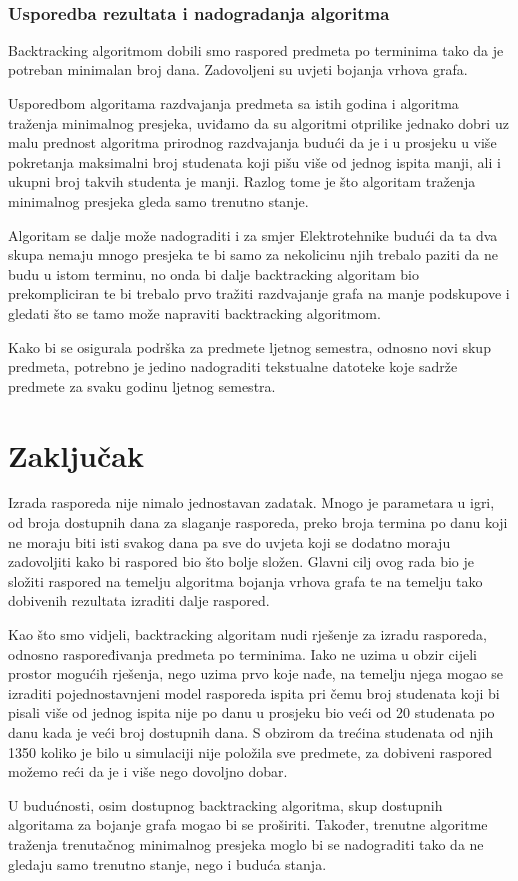 \documentclass[times, utf8, zavrsni, numeric]{fer}
\begin{document}
\newpage~\newpage
\subsection{Usporedba rezultata i nadogradanja algoritma}
Backtracking algoritmom dobili smo raspored predmeta po terminima tako da je potreban minimalan broj dana. Zadovoljeni su uvjeti bojanja vrhova grafa.\par
Usporedbom algoritama razdvajanja predmeta sa istih godina i algoritma traženja minimalnog presjeka, uviđamo da su algoritmi otprilike jednako dobri uz malu prednost algoritma prirodnog razdvajanja budući da je i u prosjeku u više pokretanja maksimalni broj studenata koji pišu više od jednog ispita manji, ali i ukupni broj takvih studenta je manji. Razlog tome je što algoritam traženja minimalnog presjeka gleda samo trenutno stanje.\par
Algoritam se dalje može nadograditi i za smjer Elektrotehnike budući da ta dva skupa nemaju mnogo presjeka te bi samo za nekolicinu njih trebalo paziti da ne budu u istom terminu, no onda bi dalje backtracking algoritam bio prekompliciran te bi trebalo prvo tražiti razdvajanje grafa na manje podskupove i gledati što se tamo može napraviti backtracking algoritmom.\par
Kako bi se osigurala podrška za predmete ljetnog semestra, odnosno novi skup predmeta, potrebno je jedino nadograditi tekstualne datoteke koje sadrže predmete za svaku godinu ljetnog semestra.

\chapter{Zaključak}
Izrada rasporeda nije nimalo jednostavan zadatak. Mnogo je parametara u igri, od broja dostupnih dana za slaganje rasporeda, preko broja termina po danu koji ne moraju biti isti svakog dana pa sve do uvjeta koji se dodatno moraju zadovoljiti kako bi raspored bio što bolje složen. Glavni cilj ovog rada bio je složiti raspored na temelju algoritma bojanja vrhova grafa te na temelju tako dobivenih rezultata izraditi dalje raspored.\par
Kao što smo vidjeli, backtracking algoritam nudi rješenje za izradu rasporeda, odnosno raspoređivanja predmeta po terminima. Iako ne uzima u obzir cijeli prostor mogućih rješenja, nego uzima prvo koje nađe, na temelju njega mogao se izraditi pojednostavnjeni model rasporeda ispita pri čemu broj studenata koji bi pisali više od jednog ispita nije po danu u prosjeku bio veći od 20 studenata po danu kada je veći broj dostupnih dana. S obzirom da trećina studenata od njih 1350 koliko je bilo u simulaciji nije položila sve predmete, za dobiveni raspored možemo reći da je i više nego dovoljno dobar.\par
U budućnosti, osim dostupnog backtracking algoritma, skup dostupnih algoritama za bojanje grafa mogao bi se proširiti. Također, trenutne algoritme traženja trenutačnog minimalnog presjeka moglo bi se nadograditi tako da ne gledaju samo trenutno stanje, nego i buduća stanja. 
~\nocite{*}

\end{document}
